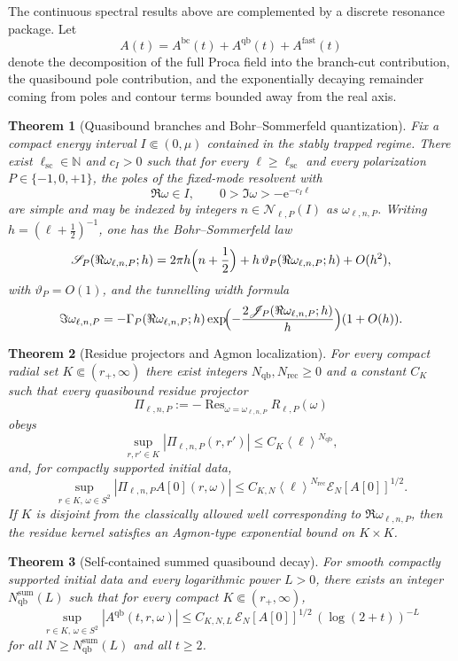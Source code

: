 \documentclass[12pt]{article}
\numberwithin{equation}{section}
\theoremstyle{plain}
\newtheorem{theorem}{Theorem}[section]
\theoremstyle{definition}
\theoremstyle{remark}
\newcommand{\N}{\mathbb N}
\newcommand{\ee}{\mathrm e}
\newcommand{\Res}{\operatorname{Res}}
\newcommand{\bc}{\mathrm{bc}}
\newcommand{\qb}{\mathrm{qb}}
\newcommand{\fast}{\mathrm{fast}}
\newcommand{\angles}[1]{\left\langle #1 \right\rangle}
\newcommand{\abs}[1]{\left|#1\right|}
\begin{document}
The continuous spectral results above are complemented by a discrete resonance package.  Let
\[
   A(t)=A^{\bc}(t)+A^{\qb}(t)+A^{\fast}(t)
\]
denote the decomposition of the full Proca field into the branch-cut contribution, the quasibound pole contribution, and the exponentially decaying remainder coming from poles and contour terms bounded away from the real axis.

\begin{theorem}[Quasibound branches and Bohr--Sommerfeld quantization]\label{thm:qb_branches}
Fix a compact energy interval $I\Subset(0,\mu)$ contained in the stably trapped regime.  There exist $\ell_{\mathrm{sc}}\in\N$ and $c_I>0$ such that for every $\ell\ge \ell_{\mathrm{sc}}$ and every polarization $P\in\{-1,0,+1\}$, the poles of the fixed-mode resolvent with
\[
   \Re\omega\in I,
   \qquad
   0>\Im\omega>-\ee^{-c_I\ell}
\]
are simple and may be indexed by integers $n\in\mathcal N_{\ell,P}(I)$ as $\omega_{\ell,n,P}$.  Writing $h=(\ell+\tfrac12)^{-1}$, one has the Bohr--Sommerfeld law
\[
   \mathscr S_P(\Re\omega_{\ell,n,P};h)
   =
   2\pi h\Bigl(n+\frac12\Bigr)
   +h\,\vartheta_P(\Re\omega_{\ell,n,P};h)
   +O(h^2),
\]
with $\vartheta_P=O(1)$, and the tunnelling width formula
\[
   \Im\omega_{\ell,n,P}
   =
   -\Gamma_P(\Re\omega_{\ell,n,P};h)
   \exp\!\Bigl(-\frac{2\mathscr J_P(\Re\omega_{\ell,n,P};h)}{h}\Bigr)
   (1+O(h)).
\]
\end{theorem}

\begin{theorem}[Residue projectors and Agmon localization]\label{thm:qb_residues}
For every compact radial set $K\Subset(r_+,\infty)$ there exist integers $N_{\qb},N_{\mathrm{rec}}\ge0$ and a constant $C_K$ such that every quasibound residue projector
\[
   \Pi_{\ell,n,P}:=-\Res_{\omega=\omega_{\ell,n,P}}R_{\ell,P}(\omega)
\]
obeys
\[
   \sup_{r,r'\in K}\abs{\Pi_{\ell,n,P}(r,r')}
   \le
   C_K\angles{\ell}^{N_{\qb}},
\]
and, for compactly supported initial data,
\[
   \sup_{r\in K,\,\omega\in S^2}\abs{\Pi_{\ell,n,P}A[0](r,\omega)}
   \le
   C_{K,N}\angles{\ell}^{N_{\mathrm{rec}}}\mathcal E_N[A[0]]^{1/2}.
\]
If $K$ is disjoint from the classically allowed well corresponding to $\Re\omega_{\ell,n,P}$, then the residue kernel satisfies an Agmon-type exponential bound on $K\times K$.
\end{theorem}

\begin{theorem}[Self-contained summed quasibound decay]\label{thm:qb_sum}
For smooth compactly supported initial data and every logarithmic power $L>0$, there exists an integer $N_{\qb}^{\mathrm{sum}}(L)$ such that for every compact $K\Subset(r_+,\infty)$,
\[
   \sup_{r\in K,\,\omega\in S^2}\abs{A^{\qb}(t,r,\omega)}
   \le
   C_{K,N,L}\,\mathcal E_N[A[0]]^{1/2}\,(\log(2+t))^{-L}
\]
for all $N\ge N_{\qb}^{\mathrm{sum}}(L)$ and all $t\ge2$.
\end{theorem}
\end{document}
